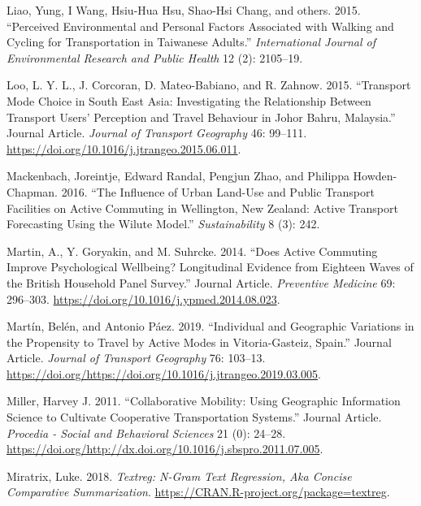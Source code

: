 \documentclass[]{elsarticle} %
\begin{document}
\leavevmode\hypertarget{ref-liao2015perceived}{}%
Liao, Yung, I Wang, Hsiu-Hua Hsu, Shao-Hsi Chang, and others. 2015.
``Perceived Environmental and Personal Factors Associated with Walking
and Cycling for Transportation in Taiwanese Adults.''
\emph{International Journal of Environmental Research and Public Health}
12 (2): 2105--19.

\leavevmode\hypertarget{ref-Loo2015transport}{}%
Loo, L. Y. L., J. Corcoran, D. Mateo-Babiano, and R. Zahnow. 2015.
``Transport Mode Choice in South East Asia: Investigating the
Relationship Between Transport Users' Perception and Travel Behaviour in
Johor Bahru, Malaysia.'' Journal Article. \emph{Journal of Transport
Geography} 46: 99--111.
\url{https://doi.org/10.1016/j.jtrangeo.2015.06.011}.

\leavevmode\hypertarget{ref-mackenbach2016influence}{}%
Mackenbach, Joreintje, Edward Randal, Pengjun Zhao, and Philippa
Howden-Chapman. 2016. ``The Influence of Urban Land-Use and Public
Transport Facilities on Active Commuting in Wellington, New Zealand:
Active Transport Forecasting Using the Wilute Model.''
\emph{Sustainability} 8 (3): 242.

\leavevmode\hypertarget{ref-Martin2014active}{}%
Martin, A., Y. Goryakin, and M. Suhrcke. 2014. ``Does Active Commuting
Improve Psychological Wellbeing? Longitudinal Evidence from Eighteen
Waves of the British Household Panel Survey.'' Journal Article.
\emph{Preventive Medicine} 69: 296--303.
\url{https://doi.org/10.1016/j.ypmed.2014.08.023}.

\leavevmode\hypertarget{ref-Martin2019individual}{}%
Martín, Belén, and Antonio Páez. 2019. ``Individual and Geographic
Variations in the Propensity to Travel by Active Modes in
Vitoria-Gasteiz, Spain.'' Journal Article. \emph{Journal of Transport
Geography} 76: 103--13.
\url{https://doi.org/https://doi.org/10.1016/j.jtrangeo.2019.03.005}.

\leavevmode\hypertarget{ref-Miller2011collaborative}{}%
Miller, Harvey J. 2011. ``Collaborative Mobility: Using Geographic
Information Science to Cultivate Cooperative Transportation Systems.''
Journal Article. \emph{Procedia - Social and Behavioral Sciences} 21
(0): 24--28.
\url{https://doi.org/http://dx.doi.org/10.1016/j.sbspro.2011.07.005}.

\leavevmode\hypertarget{ref-Miratrix2018textreg}{}%
Miratrix, Luke. 2018. \emph{Textreg: N-Gram Text Regression, Aka Concise
Comparative Summarization}.
\url{https://CRAN.R-project.org/package=textreg}.
\end{document}
